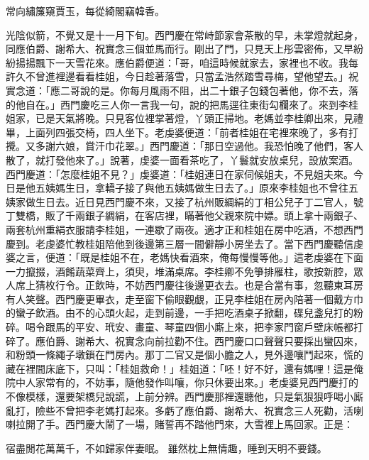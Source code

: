 常向繡簾窺賈玉，每從綺閣竊韓香。

光陰似箭，不覺又是十一月下旬。西門慶在常峙節家會茶散的早，未掌燈就起身，同應伯爵、謝希大、祝實念三個並馬而行。剛出了門，只見天上彤雲密佈，又早紛紛揚揚飄下一天雪花來。應伯爵便道：「哥，咱這時候就家去，家裡也不收。我每許久不曾進裡邊看看桂姐，今日趁著落雪，只當孟浩然踏雪尋梅，望他望去。」祝實念道：「應二哥說的是。你每月風雨不阻，出二十銀子包錢包著他，你不去，落的他自在。」西門慶吃三人你一言我一句，說的把馬逕往東街勾欄來了。來到李桂姐家，已是天氣將晚。只見客位裡掌著燈，丫頭正掃地。老媽並李桂卿出來，見禮畢，上面列四張交椅，四人坐下。老虔婆便道：「前者桂姐在宅裡來晚了，多有打攪。又多謝六娘，賞汗巾花翠。」西門慶道：「那日空過他。我恐怕晚了他們，客人散了，就打發他來了。」說著，虔婆一面看茶吃了，丫鬟就安放桌兒，設放案酒。西門慶道：「怎麼桂姐不見？」虔婆道：「桂姐連日在家伺候姐夫，不見姐夫來。今日是他五姨媽生日，拿轎子接了與他五姨媽做生日去了。」原來李桂姐也不曾往五姨家做生日去。近日見西門慶不來，又接了杭州販綢絹的丁相公兒子丁二官人，號丁雙橋，販了千兩銀子綢絹，在客店裡，瞞著他父親來院中嫖。頭上拿十兩銀子、兩套杭州重絹衣服請李桂姐，一連歇了兩夜。適才正和桂姐在房中吃酒，不想西門慶到。老虔婆忙教桂姐陪他到後邊第三層一間僻靜小房坐去了。當下西門慶聽信虔婆之言，便道：「既是桂姐不在，老媽快看酒來，俺每慢慢等他。」這老虔婆在下面一力攛掇，酒餚蔬菜齊上，須臾，堆滿桌席。李桂卿不免箏排雁柱，歌按新腔，眾人席上猜枚行令。正飲時，不妨西門慶往後邊更衣去。也是合當有事，忽聽東耳房有人笑聲。西門慶更畢衣，走至窗下偷眼觀覷，正見李桂姐在房內陪著一個戴方巾的蠻子飲酒。由不的心頭火起，走到前邊，一手把吃酒桌子掀翻，碟兒盞兒打的粉碎。喝令跟馬的平安、玳安、畫童、琴童四個小廝上來，把李家門窗戶壁床帳都打碎了。應伯爵、謝希大、祝實念向前拉勸不住。西門慶口口聲聲只要採出蠻囚來，和粉頭一條繩子墩鎖在門房內。那丁二官又是個小膽之人，見外邊嚷鬥起來，慌的藏在裡間床底下，只叫：「桂姐救命！」桂姐道：「呸！好不好，還有媽哩！這是俺院中人家常有的，不妨事，隨他發作叫嚷，你只休要出來。」老虔婆見西門慶打的不像模樣，還要架橋兒說謊，上前分辨。西門慶那裡還聽他，只是氣狠狠呼喝小廝亂打，險些不曾把李老媽打起來。多虧了應伯爵、謝希大、祝實念三人死勸，活喇喇拉開了手。西門慶大鬧了一場，賭誓再不踏他門來，大雪裡上馬回家。正是：

宿盡閒花萬萬千，不如歸家伴妻眠。
雖然枕上無情趣，睡到天明不要錢。


